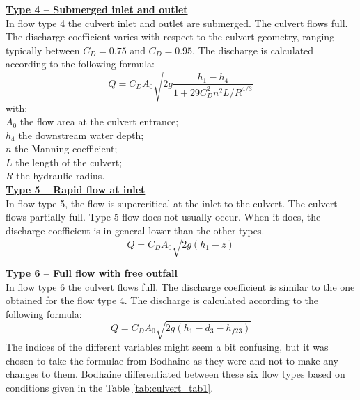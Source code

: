 \underline{\textbf{Type 4 -- Submerged inlet and outlet}}\\

In flow type 4 the culvert inlet and outlet are submerged. The culvert flows full.
The discharge coefficient varies with respect to the culvert geometry, ranging
typically between $C_D=0.75$ and $C_D=0.95$.
The discharge is calculated according to the following formula:
\begin{equation}
Q=C_D A_0 \sqrt{2g\dfrac{h_1-h_4}{1+29C_D^2 n^2 L/R^{4/3}}}
\end{equation}
with:\\
$A_0$ the flow area at the culvert entrance;\\
$h_4$ the downstream water depth;\\
$n$ the Manning coefficient;\\
$L$ the length of the culvert;\\
$R$ the hydraulic radius.\\

\underline{\textbf{Type 5 -- Rapid flow at inlet}}\\

In flow type 5, the flow is supercritical at the inlet to the culvert.
The culvert flows partially full. Type 5 flow does not usually occur.
When it does, the discharge coefficient is in general lower than the other types.
\begin{equation}
Q=C_D A_0 \sqrt{2g(h_1-z)}
\end{equation}

\underline{\textbf{Type 6 -- Full flow with free outfall}}\\

In flow type 6 the culvert flows full. The discharge coefficient is similar to the
one obtained for the flow type 4.
The discharge is calculated according to the following formula:
\begin{equation}
Q=C_D A_0 \sqrt{2g(h_1-d_3-h_{f23})}
\end{equation}
The indices of the different variables might seem a bit confusing,
but it was chosen to take the formulae from Bodhaine as they were
and not to make any changes to them.
Bodhaine differentiated between these six flow types based on conditions
given in the Table \ref{tab:culvert_tab1}.

